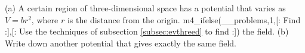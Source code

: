         (a) A certain region of three-dimensional space has a potential that varies as
        $V=br^2$, where $r$ is the distance from the origin.
m4_ifelse(__problems,1,[:%
  Find
:],[:%
        Use the techniques of subsection \ref{subsec:evthreed}
        to find 
:])%
the field.\answercheck\hwendpart
        (b) Write down another potential that gives exactly the same field.

